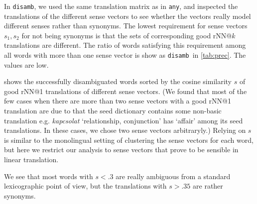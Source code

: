 \documentclass[11pt]{article}
\newcommand{\any}{\texttt{any}}
\newcommand{\disamb}{\texttt{disamb}}
\begin{document}
In \disamb, we used the same translation matrix as in \any, and inspected the
translations of the different sense vectors to see whether the vectors really
model different senses rather than synonyms.
The lowest requirement for sense vectors $s_1, s_2$ for not being synonyms is
that the sets of corresponding good rNN@$k$ translations are different. The
ratio of words satisfying this requirement among all words with more than one
sense vector is show as \disamb~in \cref{tab:prec}. The values are low.

\newcommand{\bad}{$^\text{\frownie}$}

 shows the successfully disambiguated words sorted by the
cosine similarity $s$ of good rNN@1 translations of different sense vectors. (We
found that most of the few cases when there are more than two sense vectors
with a good rNN@1 translation are due to that the seed dictionary contains some
non-basic translation e.g. \emph{kapcsolat} `relationship, conjunction' has
`affair' among its seed translations. In these cases, we chose two sense
vectors arbitraryly.)  Relying on $s$ is similar to the monolingual setting of
clustering the sense vectors for each word, but here we restrict our analysis
to sense vectors that prove to be sensible in linear translation.

We see that most words with $s<.3$ are really ambiguous from a standard
lexicographic point of view, but the translations with $s>.35$ are rather
synonyms.
\end{document}
